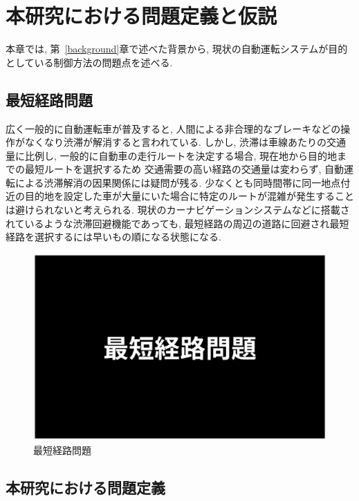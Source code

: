 \chapter{本研究における問題定義と仮説}
\label{issue}

本章では, 第~\ref{background}章で述べた背景から, 現状の自動運転システムが目的としている制御方法の問題点を述べる.

\section{最短経路問題}


広く一般的に自動運転車が普及すると, 人間による非合理的なブレーキなどの操作がなくなり渋滞が解消すると言われている.
しかし, 渋滞は車線あたりの交通量に比例し, 一般的に自動車の走行ルートを決定する場合, 現在地から目的地までの最短ルートを選択するため
交通需要の高い経路の交通量は変わらず, 自動運転による渋滞解消の因果関係には疑問が残る.
少なくとも同時間帯に同一地点付近の目的地を設定した車が大量にいた場合に特定のルートが混雑が発生することは避けられないと考えられる.
現状のカーナビゲーションシステムなどに搭載されているような渋滞回避機能であっても, 最短経路の周辺の道路に回避され最短経路を選択するには早いもの順になる状態になる.




\begin{figure}[H]
    \centering  %
    \includegraphics[clip,width = 13.0cm]{assets/shorten_route.eps}
    \caption{最短経路問題}  \label{sample}
\end{figure}

  

\section{本研究における問題定義}

